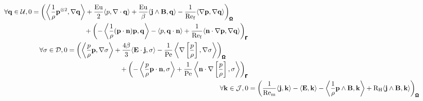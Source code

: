     \begin{align}
        \begin{split}
            \forall \mathbf{q} \in \mathcal{U},  0  &=  \left(\left\langle\frac{1}{\rho}\mathbf{p}^{\otimes 2}, \nabla\mathbf{q}\right\rangle + \frac{\mathrm{Eu}}{2}\langle p, \nabla\cdot\mathbf{q}\rangle + \frac{\mathrm{Eu}}{\beta}\langle\mathbf{j}\wedge\mathbf{B}, \mathbf{q}\rangle - \frac{1}{\mathrm{Re}_{\mathrm{f}}}\langle\nabla\mathbf{p}, \nabla\mathbf{q}\rangle\right)_{\pmb{\mathsf{\Omega}}}  \\
            &\;\;\;\;\;\;\;\;\;\;\;\;\;\;\;\;\;\;\;\;\;\;\;\;\;\;\;\;  + \left(- \left\langle\frac{1}{\rho}(\mathbf{p}\cdot\mathbf{n})\mathbf{p}, \mathbf{q}\right\rangle - \langle p, \mathbf{q}\cdot\mathbf{n}\rangle + \frac{1}{\mathrm{Re}_{\mathrm{f}}}\langle\mathbf{n}\cdot\nabla\mathbf{p}, \nabla\mathbf{q}\rangle\right)_{\pmb{\mathsf{\Gamma}}}
        \end{split}  \\
        \begin{split}
            \forall \sigma \in \mathcal{D},  0  &=  \left(\left\langle\frac{p}{\rho}\mathbf{p}, \nabla\sigma\right\rangle + \frac{4\beta}{3}\langle\mathbf{E}\cdot\mathbf{j}, \sigma\rangle - \frac{1}{\mathrm{Pe}}\left\langle\nabla\left[\frac{p}{\rho}\right], \nabla\sigma\right\rangle\right)_{\pmb{\mathsf{\Omega}}}  \\
            &\;\;\;\;\;\;\;\;\;\;\;\;\;\;\;\;\;\;\;\;\;\;\;\;\;\;\;\;  + \left(- \left\langle\frac{p}{\rho}\mathbf{p}\cdot\mathbf{n}, \sigma\right\rangle + \frac{1}{\mathrm{Pe}}\left\langle\mathbf{n}\cdot\nabla\left[\frac{p}{\rho}\right], \sigma\right\rangle\right)_{\pmb{\mathsf{\Gamma}}}
        \end{split}  \\
        \forall \mathbf{k} \in \mathcal{J},  0  &=  \left(\frac{1}{\mathrm{Re}_{\mathrm{m}}}\langle\mathbf{j}, \mathbf{k}\rangle - \langle\mathbf{E}, \mathbf{k}\rangle - \left\langle\frac{1}{\rho}\mathbf{p}\wedge\mathbf{B}, \mathbf{k}\right\rangle + \mathrm{R}_{\mathrm{H}}\langle\mathbf{j}\wedge\mathbf{B}, \mathbf{k}\rangle\right)_{\pmb{\mathsf{\Omega}}}  \\
    \end{align}
    